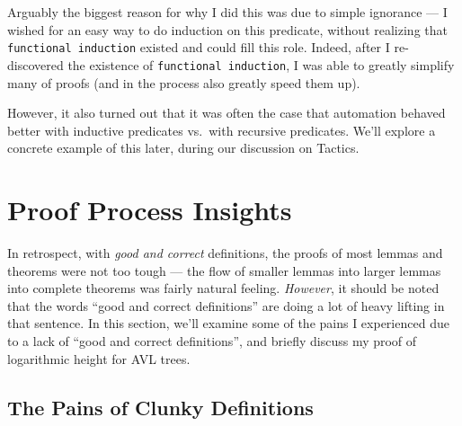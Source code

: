 \documentclass[acmsmall, authorversion, nonacm, overload]{acmart}
\begin{document}
\newpage
Arguably the biggest reason for why I did this was due to simple ignorance ---
I wished for an easy way to do induction on this predicate, without realizing that \texttt{functional induction}
existed and could fill this role.
Indeed, after I re-discovered the existence of \texttt{functional induction},
I was able to greatly simplify many of proofs (and in the process also greatly speed them up).

However, it also turned out that it was often the case that automation behaved better
with inductive predicates vs.\ with recursive predicates.
We'll explore a concrete example of this later, during our discussion on Tactics.

\section{Proof Process Insights}

In retrospect, with \emph{good and correct} definitions, the proofs of
most lemmas and theorems were not too tough --- the flow of smaller lemmas
into larger lemmas into complete theorems was fairly natural feeling.
\emph{However}, it should be noted that
the words ``good and correct definitions'' are doing a lot of heavy lifting in that sentence.
In this section, we'll examine some of the pains I experienced due to a lack of ``good and correct definitions'',
and briefly discuss my proof of logarithmic height for AVL trees.

\subsection{The Pains of Clunky Definitions}
\end{document}
